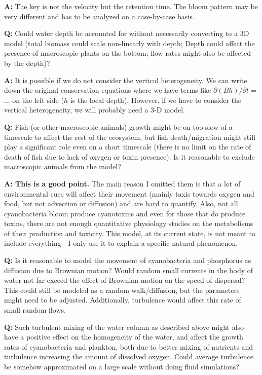 \documentclass{article}
\begin{document}
\textbf{A:} The key is not the velocity but the retention time. The bloom pattern may be very different and has to be analyzed on a case-by-case basis.
\bigskip

\textbf{Q:} Could water depth be accounted for without necessarily converting to a 3D model (total biomass could scale non-linearly with depth; Depth could affect the presence of macroscopic plants on the bottom; flow rates might also be affected by the depth)?

\textbf{A:} It is possible if we do not consider the vertical heterogeneity. We can write down the original conservation equations where we have terms like $\partial (B h)/\partial t =$ ... on the left side ($h$ is the local depth). However, if we have to consider the vertical heterogeneity, we will probably need a 3-D model.
\bigskip

\textbf{Q:} Fish (or other macroscopic animals) growth might be on too slow of a timescale to affect the rest of the ecosystem, but fish death/migration might still play a significant role even on a short timescale (there is no limit on the rate of death of fish due to lack of oxygen or toxin presence). Is it reasonable to exclude macroscopic animals from the model?

\textbf{A: This is a good point.} The main reason I omitted them is that a lot of environmental cues will affect their movement (mainly taxis towards oxygen and food, but not advection or diffusion) and are hard to quantify. Also, not all cyanobacteria bloom produce cyanotoxins and even for those that do produce toxins, there are not enough quantitative physiology studies on the metabolisms of their production and toxicity. This model, at its current state, is not meant to include everything - I only use it to explain a specific natural phenomenon.
\bigskip

\textbf{Q:} Is it reasonable to model the movement of cyanobacteria and phosphorus as diffusion due to Brownian motion? Would random small currents in the body of water not far exceed the effect of Brownian motion on the speed of dispersal? This could still be modeled as a random walk/diffusion, but the parameters might need to be adjusted. Additionally, turbulence would affect this rate of small random flows.

\textbf{Q:} Such turbulent mixing of the water column as described above might also have a positive effect on the homogeneity of the water, and affect the growth rates of cyanobacteria and plankton, both due to better mixing of nutrients and turbulence increasing the amount of dissolved oxygen. Could average turbulence be somehow approximated on a large scale without doing fluid simulations?
\end{document}
